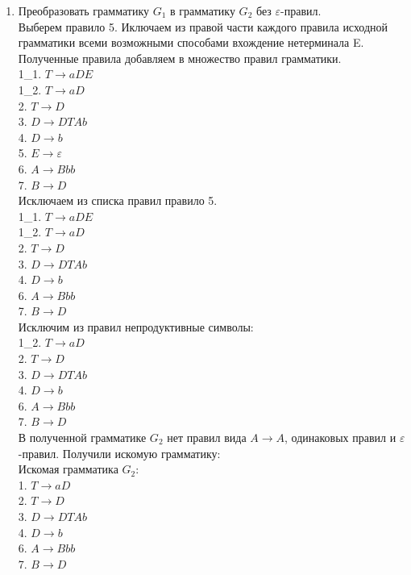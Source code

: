 \documentclass[a4paper,14pt]{extarticle}
\begin{document}
\begin{enumerate}[1.]
\item Преобразовать грамматику $G_1$ в грамматику $G_2$ без $\varepsilon$-правил.\\
Выберем правило 5. Иключаем из правой части каждого правила исходной грамматики
всеми возможными способами вхождение нетерминала E. Полученные правила добавляем в множество 
правил грамматики.\\
1\_1. $T \rightarrow aDE$\\
1\_2. $T \rightarrow aD$\\
2. $T \rightarrow D$\\
3. $D \rightarrow DTAb$\\
4. $D \rightarrow b$\\
5. $E \rightarrow \varepsilon$\\
6. $A \rightarrow Bbb$\\
7. $B \rightarrow D$\\
Исключаем из списка правил правило 5.\\
1\_1. $T \rightarrow aDE$\\
1\_2. $T \rightarrow aD$\\
2. $T \rightarrow D$\\
3. $D \rightarrow DTAb$\\
4. $D \rightarrow b$\\
6. $A \rightarrow Bbb$\\
7. $B \rightarrow D$\\
Исключим из правил непродуктивные символы:\\
1\_2. $T \rightarrow aD$\\
2. $T \rightarrow D$\\
3. $D \rightarrow DTAb$\\
4. $D \rightarrow b$\\
6. $A \rightarrow Bbb$\\
7. $B \rightarrow D$\\
В полученной грамматике $G_2$ нет правил вида $A \rightarrow A$, одинаковых правил и $\varepsilon$-правил. Получили искомую грамматику:\\
Искомая грамматика $G_2$:\\
1. $T \rightarrow aD$\\
2. $T \rightarrow D$\\
3. $D \rightarrow DTAb$\\
4. $D \rightarrow b$\\
6. $A \rightarrow Bbb$\\
7. $B \rightarrow D$\\


\end{enumerate}
\end{document}
